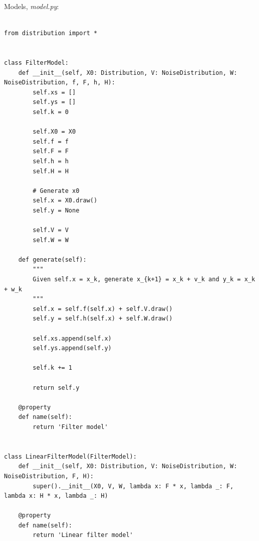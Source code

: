 \documentclass[paper=a4, fontsize=11pt]{scrartcl} %
\numberwithin{equation}{section} %
\numberwithin{figure}{section} %
\numberwithin{table}{section} %
\begin{document}
Models, \textit{model.py}:
\begin{lstlisting}

from distribution import *


class FilterModel:
    def __init__(self, X0: Distribution, V: NoiseDistribution, W: NoiseDistribution, f, F, h, H):
        self.xs = []
        self.ys = []
        self.k = 0

        self.X0 = X0
        self.f = f
        self.F = F
        self.h = h
        self.H = H

        # Generate x0
        self.x = X0.draw()
        self.y = None

        self.V = V
        self.W = W

    def generate(self):
        """
        Given self.x = x_k, generate x_{k+1} = x_k + v_k and y_k = x_k + w_k
        """
        self.x = self.f(self.x) + self.V.draw()
        self.y = self.h(self.x) + self.W.draw()

        self.xs.append(self.x)
        self.ys.append(self.y)

        self.k += 1

        return self.y

    @property
    def name(self):
        return 'Filter model'


class LinearFilterModel(FilterModel):
    def __init__(self, X0: Distribution, V: NoiseDistribution, W: NoiseDistribution, F, H):
        super().__init__(X0, V, W, lambda x: F * x, lambda _: F, lambda x: H * x, lambda _: H)

    @property
    def name(self):
        return 'Linear filter model'


\end{lstlisting}
\end{document}
